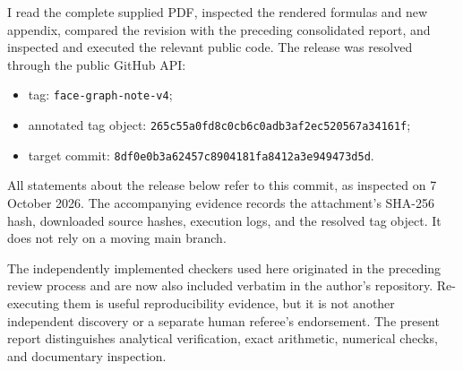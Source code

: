 \documentclass[11pt,a4paper]{article}
\begin{document}
I read the complete supplied PDF, inspected the rendered formulas and new appendix, compared the revision with the preceding consolidated report, and inspected and executed the relevant public code. The release was resolved through the public GitHub API:
\begin{itemize}
\item tag: \texttt{face-graph-note-v4};
\item annotated tag object: \texttt{265c55a0fd8c0cb6c0adb3af2ec520567a34161f};
\item target commit: \texttt{8df0e0b3a62457c8904181fa8412a3e949473d5d}.
\end{itemize}
All statements about the release below refer to this commit, as inspected on 7 October 2026. The accompanying evidence records the attachment's SHA-256 hash, downloaded source hashes, execution logs, and the resolved tag object. It does not rely on a moving main branch.

The independently implemented checkers used here originated in the preceding review process and are now also included verbatim in the author's repository. Re-executing them is useful reproducibility evidence, but it is not another independent discovery or a separate human referee's endorsement. The present report distinguishes analytical verification, exact arithmetic, numerical checks, and documentary inspection.
\end{document}
